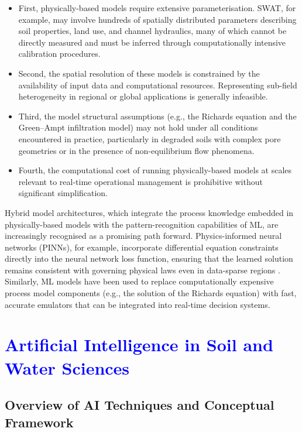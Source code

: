 \documentclass[land,article,submit,pdftex,moreauthors]{Definitions/mdpi}
\numberwithin{equation}{section}
\begin{document}
\begin{itemize}
    \item First, physically-based models require extensive parameterisation. SWAT, for example, may involve hundreds of spatially distributed parameters describing soil properties, land use, and channel hydraulics, many of which cannot be directly measured and must be inferred through computationally intensive calibration procedures.
    \item Second, the spatial resolution of these models is constrained by the availability of input data and computational resources. Representing sub-field heterogeneity in regional or global applications is generally infeasible.    
    \item Third, the model structural assumptions (e.g., the Richards equation and the Green--Ampt infiltration model) may not hold under all conditions encountered in practice, particularly in degraded soils with complex pore geometries or in the presence of non-equilibrium flow phenomena.    
    \item Fourth, the computational cost of running physically-based models at scales relevant to real-time operational management is prohibitive without significant simplification.
\end{itemize}

Hybrid model architectures, which integrate the process knowledge embedded in physically-based models with the pattern-recognition capabilities of ML, are increasingly recognised as a promising path forward. Physics-informed neural networks (PINNs), for example, incorporate differential equation constraints directly into the neural network loss function, ensuring that the learned solution remains consistent with governing physical laws even in data-sparse regions \citep{raissi2019physics}. Similarly, ML models have been used to replace computationally expensive process model components (e.g., the solution of the Richards equation) with fast, accurate emulators that can be integrated into real-time decision systems.


\section{\textcolor{blue}{Artificial Intelligence in Soil and Water Sciences}}

\subsection{Overview of AI Techniques and Conceptual Framework}
\end{document}
